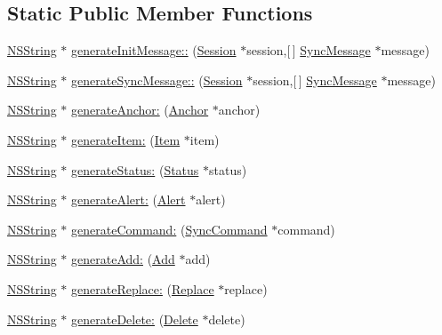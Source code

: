 \subsection*{\-Static \-Public \-Member \-Functions}
\begin{DoxyCompactItemize}
\item 
\hyperlink{class_n_s_string}{\-N\-S\-String} $\ast$ \hyperlink{interface_sync_x_m_l_generator_a9abe02b42fa8da34aa276c3e6a5e804f}{generate\-Init\-Message\-::} (\hyperlink{interface_session}{\-Session} $\ast$session,\mbox{[}$\,$\mbox{]} \hyperlink{interface_sync_message}{\-Sync\-Message} $\ast$message)
\item 
\hyperlink{class_n_s_string}{\-N\-S\-String} $\ast$ \hyperlink{interface_sync_x_m_l_generator_a70325198a6721de22822f04cb9843237}{generate\-Sync\-Message\-::} (\hyperlink{interface_session}{\-Session} $\ast$session,\mbox{[}$\,$\mbox{]} \hyperlink{interface_sync_message}{\-Sync\-Message} $\ast$message)
\item 
\hyperlink{class_n_s_string}{\-N\-S\-String} $\ast$ \hyperlink{interface_sync_x_m_l_generator_a20f39de42042abc02ec0aac0796abcfc}{generate\-Anchor\-:} (\hyperlink{interface_anchor}{\-Anchor} $\ast$anchor)
\item 
\hyperlink{class_n_s_string}{\-N\-S\-String} $\ast$ \hyperlink{interface_sync_x_m_l_generator_a6b53613fa727aad841421f7448c742b7}{generate\-Item\-:} (\hyperlink{interface_item}{\-Item} $\ast$item)
\item 
\hyperlink{class_n_s_string}{\-N\-S\-String} $\ast$ \hyperlink{interface_sync_x_m_l_generator_aeb9e74a9dd7a71e07184c4ffcf9dfb12}{generate\-Status\-:} (\hyperlink{interface_status}{\-Status} $\ast$status)
\item 
\hyperlink{class_n_s_string}{\-N\-S\-String} $\ast$ \hyperlink{interface_sync_x_m_l_generator_a857ac7e2b3dc878a4cf3a9b475d2fe44}{generate\-Alert\-:} (\hyperlink{interface_alert}{\-Alert} $\ast$alert)
\item 
\hyperlink{class_n_s_string}{\-N\-S\-String} $\ast$ \hyperlink{interface_sync_x_m_l_generator_a6f198ee7114739a866cac9d59ecdab05}{generate\-Command\-:} (\hyperlink{interface_sync_command}{\-Sync\-Command} $\ast$command)
\item 
\hyperlink{class_n_s_string}{\-N\-S\-String} $\ast$ \hyperlink{interface_sync_x_m_l_generator_a69610456aec29a5d1ed1ff64880da186}{generate\-Add\-:} (\hyperlink{interface_add}{\-Add} $\ast$add)
\item 
\hyperlink{class_n_s_string}{\-N\-S\-String} $\ast$ \hyperlink{interface_sync_x_m_l_generator_a015ebb59be93fbec495252a10d40b8b5}{generate\-Replace\-:} (\hyperlink{interface_replace}{\-Replace} $\ast$replace)
\item 
\hyperlink{class_n_s_string}{\-N\-S\-String} $\ast$ \hyperlink{interface_sync_x_m_l_generator_af71cc5609bde222bf5ad0cd2bec73859}{generate\-Delete\-:} (\hyperlink{interface_delete}{\-Delete} $\ast$delete)
\end{DoxyCompactItemize}


